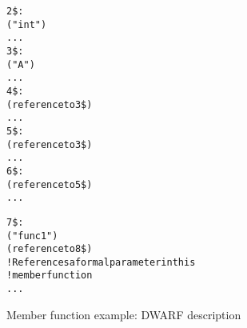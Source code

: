 \begin{figure}[h]
\begin{dwflisting}
\begin{alltt}

2\$: \DWTAGbasetype
        \DWATname("int")
        ...
3\$: \DWTAGclasstype
        \DWATname("A")
        ...
4\$:     \DWTAGpointertype
            \DWATtype(reference to 3\$)
            ...
5\$:     \DWTAGconsttype
            \DWATtype(reference to 3\$)
            ...
6\$:     \DWTAGpointertype
            \DWATtype(reference to 5\$)
            ...

7\$:     \DWTAGsubprogram
            \DWATdeclaration
            \DWATname("func1")
            \DWATobjectpointer(reference to 8\$) 
                ! References a formal parameter in this 
                ! member function
            ...

\end{alltt}
\end{dwflisting}
\caption{Member function example: DWARF description}
\label{fig:memberfunctionexampledwarfdescription}
\end{figure}

